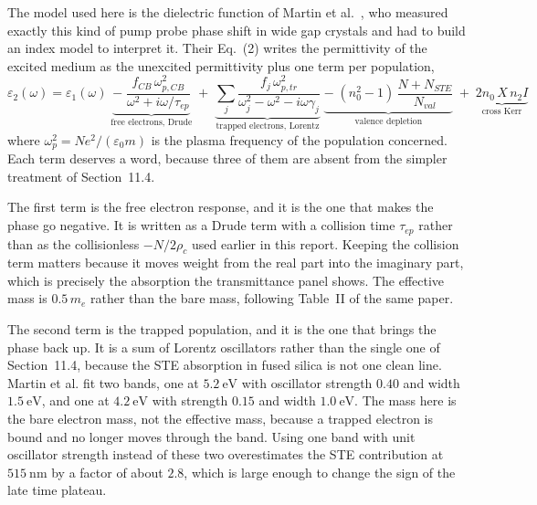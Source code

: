 The model used here is the dielectric function of Martin et al.~\cite{martin1997}, who measured exactly this kind of pump probe phase shift in wide gap crystals and had to build an index model to interpret it. Their Eq.~(2) writes the permittivity of the excited medium as the unexcited permittivity plus one term per population,
\begin{equation}
\label{eq:martin_eps}
\varepsilon_2(\omega) = \varepsilon_1(\omega)
\;\underbrace{-\;\frac{f_{CB}\,\omega_{p,CB}^2}{\omega^2 + i\omega/\tau_{ep}}}_{\text{free electrons, Drude}}
\;+\;\underbrace{\sum_j \frac{f_j\,\omega_{p,tr}^2}{\omega_j^2-\omega^2-i\omega\gamma_j}}_{\text{trapped electrons, Lorentz}}
\;\underbrace{-\;(n_0^2-1)\,\frac{N+N_{STE}}{N_{val}}}_{\text{valence depletion}}
\;+\;\underbrace{2n_0\,X\,n_2 I}_{\text{cross Kerr}}
\end{equation}
where $\omega_{p}^2=Ne^2/(\varepsilon_0 m)$ is the plasma frequency of the population concerned. Each term deserves a word, because three of them are absent from the simpler treatment of Section~11.4.

The first term is the free electron response, and it is the one that makes the phase go negative. It is written as a Drude term with a collision time $\tau_{ep}$ rather than as the collisionless $-N/2\rho_c$ used earlier in this report. Keeping the collision term matters because it moves weight from the real part into the imaginary part, which is precisely the absorption the transmittance panel shows. The effective mass is $0.5\,m_e$ rather than the bare mass, following Table~II of the same paper.

The second term is the trapped population, and it is the one that brings the phase back up. It is a sum of Lorentz oscillators rather than the single one of Section~11.4, because the STE absorption in fused silica is not one clean line. Martin et al. fit two bands, one at $5.2\ \text{eV}$ with oscillator strength $0.40$ and width $1.5\ \text{eV}$, and one at $4.2\ \text{eV}$ with strength $0.15$ and width $1.0\ \text{eV}$. The mass here is the bare electron mass, not the effective mass, because a trapped electron is bound and no longer moves through the band. Using one band with unit oscillator strength instead of these two overestimates the STE contribution at $515\ \text{nm}$ by a factor of about $2.8$, which is large enough to change the sign of the late time plateau.

